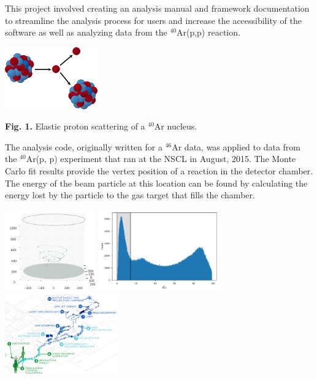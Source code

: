 \documentclass[ansiepaperDNP,portrait]{baposter}
\begin{document}
\begin{poster}
{{This project involved creating an analysis manual and framework documentation to streamline the analysis process for users and increase the accessibility of the software as well as analyzing data from the $^{40}$Ar(p,p) reaction.}

\begin{center}
\includegraphics[width=40mm]{ar40_p.png}
\end{center}

\small{\textbf{Fig. 1.} Elastic proton scattering of a $^{40}$Ar nucleus.}
}
{\small{The analysis code, originally written for a $^{46}$Ar data, was applied to data from the $^{40}$Ar(p, p) experiment that ran at the NSCL in August,  2015.}
\small{The Monte Carlo fit results provide the vertex position of a reaction in the detector chamber. The energy of the beam particle at this location can be found by calculating the energy lost by the particle to the gas target that fills the chamber.}

\begin{center}
\includegraphics[height=35mm]{chamber_plot.png}
\hspace{.5cm}
\includegraphics [height=35mm] {chi2pos.pdf}
\hspace{.5cm}
\includegraphics [height=35mm] {nscl_schematic.png}
\end{center}

}
\end{poster}
\end{document}
